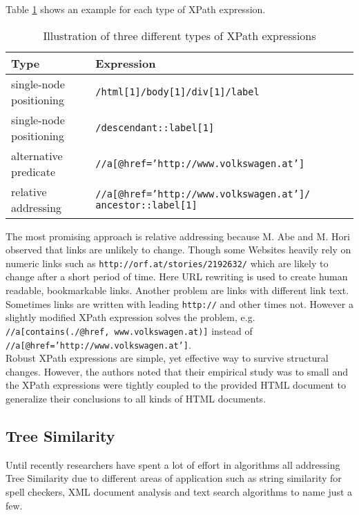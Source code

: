 \documentclass[12pt, notitlepage]{article}
\begin{document}
\vspace{1cm}
Table \ref{tab:xPath-expressions} shows an example for each type of XPath expression.
\begin{table}[H]
	\begin{tabularx}{\textwidth}{l|X}
		\textbf{Type} & \textbf{Expression} \\
		\hline
		single-node positioning & \texttt{/html[1]/body[1]/div[1]/label} \\
		single-node positioning & \texttt{/descendant::label[1]} \\
		alternative predicate & \texttt{//a[@href='http://www.volkswagen.at']} \\
		relative addressing & \texttt{//a[@href='http://www.volkswagen.at']/ ancestor::label[1]} \\
	\end{tabularx}
	\caption{Illustration of three different types of XPath expressions}
	\label{tab:xPath-expressions}
\end{table}
The most promising approach is relative addressing because M. Abe and M. Hori observed that links are unlikely to change. 
Though some Websites heavily rely on numeric links such as \texttt{http://orf.at/stories/2192632/} which are likely to change after a short period of time. Here URL rewriting 
is used to create human readable, bookmarkable links. Another problem are links with different link text. Sometimes links are written with leading \texttt{http://} and other times not. However a slightly modified XPath expression solves the problem, e.g.
\texttt{//a[contains(./@href, www.volkswagen.at)]} instead of \texttt{//a[@href='http://www.volkswagen.at']}.\\
Robust XPath expressions are simple, yet effective way to survive structural changes. However, the authors noted that their empirical study was to small and the XPath expressions were tightly coupled to the provided HTML document to generalize their conclusions to all kinds of HTML documents.  
\subsection{Tree Similarity}
Until recently researchers have spent a lot of effort in algorithms all addressing Tree Similarity due to different areas of application such as string similarity for spell checkers,
XML document analysis and text search algorithms to name just a few.
\end{document}
